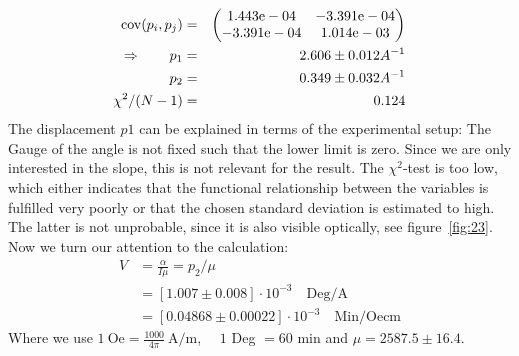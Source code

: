\begin{eqnarray}
    \mathrm{cov}(p_i, p_j) &=& 
    \begin{pmatrix}
        1.443\mathrm{e}-04 &-3.391\mathrm{e}-04 \\
        -3.391\mathrm{e}-04 &1.014\mathrm{e}-03 \\
    \end{pmatrix}
\\ \Rightarrow \qquad
    p_1 &=& 2.606 \pm 0.012 A^{-1}\\
    p_2 &=& 0.349 \pm 0.032 A^{-1} \\
    \chi ^2/(N-1) &=&  0.124
\end{eqnarray}
The displacement $p1$ can be explained in terms of the experimental setup: The Gauge of the 
angle is not fixed such that the lower limit is zero. Since we are only interested in the slope,
this is not relevant for the result. The $\chi^2$-test is too low, which either indicates that
the functional relationship between the variables is fulfilled very poorly or that the chosen
standard deviation is estimated to high. The latter is not unprobable, since it is also
visible optically, see figure~\ref{fig:23}. Now we turn our attention to the calculation:
\begin{align}
    V &= \frac{\alpha}{I\mu}   = p_2 / \mu \\
      &= \left [ 1.007 \pm 0.008 \right ]\cdot 10^{-3} \quad \mathrm{Deg/A} \\
      &= \left [ 0.04868 \pm 0.00022 \right ] \cdot 10^{-3} \quad \mathrm{Min/Oe cm}
\end{align}
Where we use $1\ \mathrm{Oe} = \frac{1000}{4\pi}\ \mathrm{A/m}$, $\quad1$ Deg $=60$ min \quad and $\mu = 2587.5\pm16.4$.


